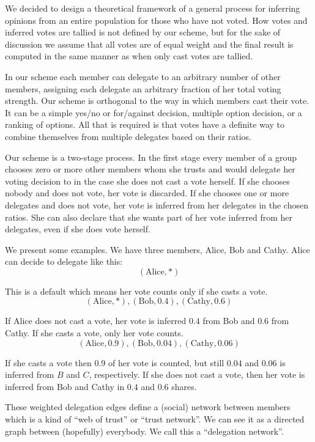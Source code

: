 \documentclass[a4paper]{acm_proc_article-sp}
\begin{document}
We decided to design a theoretical framework of a general process for inferring opinions from an entire population for
those who have not voted. How votes and inferred votes are tallied is not defined by our scheme, but for the
sake of discussion we assume that all votes are of equal weight and the final result is computed in the same manner as when
only cast votes are tallied.

In our scheme each member can delegate to an arbitrary number of other members, assigning each delegate an arbitrary fraction
of her total voting strength. Our scheme is orthogonal to the way in which members cast their vote. It can be a simple
yes/no or for/against decision, multiple option decision, or a ranking of options. All that is required is that votes have a
definite way to combine themselves from multiple delegates based on their ratios.

Our scheme is a two-stage process. In the first stage every member of a group chooses zero or more other members whom she
trusts and would delegate her voting decision to in the case she does not cast a vote herself. If she chooses nobody and
does not vote, her vote is discarded. If she chooses one or more delegates and does not vote, her vote is inferred from
her delegates in the chosen ratios. She can also declare that she wants part of her vote inferred from her delegates,
even if she does vote herself.

We present some examples. We have three members, Alice, Bob and Cathy. Alice can decide to delegate like this:
$$(\mathrm{Alice}, *)$$

This is a default which means her vote counts only if she casts a vote.
$$(\mathrm{Alice}, *), (\mathrm{Bob}, 0.4), (\mathrm{Cathy}, 0.6)$$

If Alice does not cast a vote, her vote is inferred $0.4$ from Bob and $0.6$ from Cathy. If she casts a vote, only her
vote counts.
$$(\mathrm{Alice}, 0.9), (\mathrm{Bob}, 0.04), (\mathrm{Cathy}, 0.06)$$

If she casts a vote then $0.9$ of her vote is counted, but still $0.04$ and $0.06$ is inferred from $B$ and $C$, respectively.
If she does not cast a vote, then her vote is inferred from Bob and Cathy in $0.4$ and $0.6$ shares.

These weighted delegation edges define a (social) network between members which is a kind of ``web of trust'' or
``trust network''. We can see it as a directed graph between (hopefully) everybody. We call this a ``delegation network''.
\end{document}
